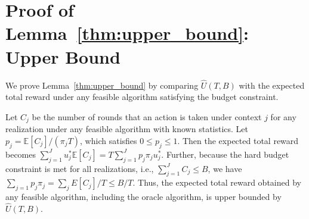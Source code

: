 \section{Proof of Lemma~\ref{thm:upper_bound}: Upper Bound}\label{app:proof_upper_bound}




We prove Lemma~\ref{thm:upper_bound} by comparing $\widehat{U}(T,B)$ with the expected total reward under any feasible algorithm satisfying the budget constraint.

Let $C_j$ be the number of rounds that an action is taken  under context $j$ for any realization under any feasible algorithm with known statistics. Let $p_j = \mathbb{E}[C_j]/(\pi_j T)$, which satisfies $0 \leq p_j \leq 1$. Then the expected total reward becomes $\sum_{j = 1}^J u_j^* \mathbb{E}[C_j] = T\sum_{j = 1}^J p_j \pi_j u_j^*$. Further, because the hard budget constraint is met for all realizations, i.e., $\sum_{j = 1}^J C_j \leq  B$, we have $\sum_{j = 1} p_j \pi_j = \sum_j E[C_j]/T \leq B/T$. Thus, the expected total reward obtained by any feasible algorithm, including the oracle algorithm, is upper bounded by $\widehat{U}(T,B)$. 